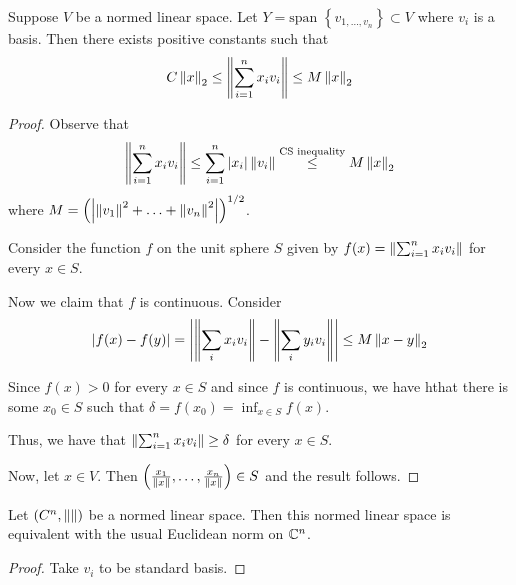     \begin{proposition}
	Suppose $V$ be a normed linear space. Let $Y = \text{span } \left\{ v_{1,\ldots , v_{n}} \right\} \subset V$ where $v_{i}$ is a basis. Then
	there exists positive constants such that
	\begin{align*}
	    C \left\lVert x \right\rVert_{2} \le \left\lVert \sum_{i=1}^{n} x_{i} v_{i} \right\rVert \le M \left\lVert x \right\rVert_{2}
	\end{align*}
	\label{prop:finite-dim-noob}
    \end{proposition}
    \begin{proof}
	Observe that
	\begin{align*}
	    \left\lVert \sum_{i=1}^{n} x_{i} v_{i} \right\rVert \le \sum_{i=1}^{n} \left\lvert x_{i} \right\rvert \left\lVert v_{i} \right\rVert
	    \stackrel{\text{CS inequality}}{\le }M \left\lVert x \right\rVert_{2}
	\end{align*}
	where $M= \left( \left\lvert \left\lVert v_{1} \right\rVert^{2} + \ldots + \left\lVert v_{n} \right\rVert^{2} \right\rvert \right)^{1/2}$.

	Consider the function $f$ on the unit sphere $S$ given by
	$f(x)=\left\lVert \sum_{i=1}^{n} x_{i} v_{i} \right\rVert$ for every $x\in S$.

	Now we claim that $f$ is continuous.
	Consider
	\begin{align*}
	    \left\lvert f(x)-f(y) \right\rvert = \left\lvert \left\lVert \sum_{i} x_{i} v_{i} \right\rVert  - \left\lVert \sum_{i} y_{i} v_{i} \right\rVert  \right\rvert \le M \left\lVert x-y \right\rVert_{2}
	\end{align*}

	Since $f(x)>0$ for every $x\in S$ and since $f$ is continuous, we have hthat there is some $x_{0} \in S$ such that $\delta = f(x_{0}) = \inf_{x\in S} f\left( x \right)$.

	Thus, we have that $\left\lVert \sum_{i=1}^{n} x_{i} v_{i} \right\rVert \ge \delta$ for every $x\in S$.

	Now, let $x\in V$. Then $\left( \frac{x_{1}}{\left\lVert x \right\rVert}, \ldots , \frac{x_{n}}{\left\lVert x \right\rVert} \right) \in S$ and the result follows.
    \end{proof}

    \begin{corollary}
	Let $\left( C^{n}, \left\lVert  \right\rVert \right)$ be a normed linear space. Then this normed linear space is equivalent with the usual Euclidean norm on $\mathbb C ^{n}$.
    \end{corollary}
    \begin{proof}
	Take $v_{i}$ to be standard basis.
    \end{proof}

